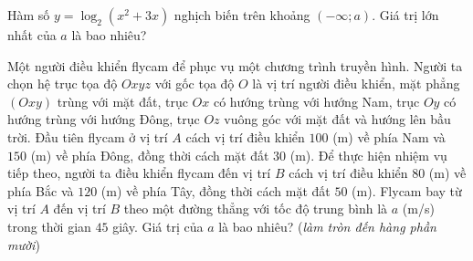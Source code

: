 \begin{ex}%
	Hàm số $y=\log_2(x^2+3x)$ nghịch biến trên khoảng $(-\infty; a)$. Giá trị lớn nhất của $a$ là bao nhiêu?
	\par{}
\end{ex}

\begin{ex}%
	Một người điều khiển flycam để phục vụ một chương trình truyền hình. Người ta chọn hệ trục tọa độ $Oxyz$ với gốc tọa độ $O$ là vị trí người điều khiển, mặt phẳng $(Oxy)$ trùng với mặt đất, trục $Ox$ có hướng trùng với hướng Nam, trục $Oy$ có hướng trùng với hướng Đông, trục $Oz$ vuông góc với mặt đất và hướng lên bầu trời. Đầu tiên flycam ở vị trí $A$ cách vị trí điều khiển $100$ (m) về phía Nam và $150$ (m) về phía Đông, đồng thời cách mặt đất $30$ (m). Để thực hiện nhiệm vụ tiếp theo, người ta điều khiển flycam đến vị trí $B$ cách vị trí điều khiển $80$ (m) về phía Bắc và $120$ (m) về phía Tây, đồng thời cách mặt đất $50$ (m). Flycam bay từ vị trí $A$ đến vị trí $B$ theo một đường thẳng với tốc độ trung bình là $a$ (m/s) trong thời gian $45$ giây. Giá trị của $a$ là bao nhiêu? (\textit{làm tròn đến hàng phần mười})
	\par{}
\end{ex}

